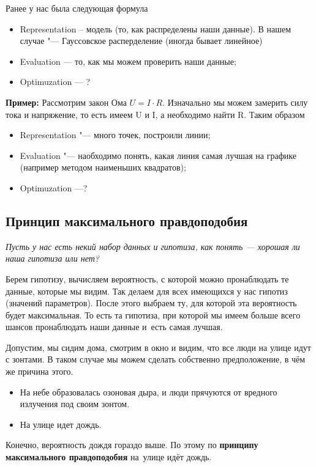 

\begin{Zam}
Ранее у нас была следующая формула\\
{ \setlength{\fboxrule}{2pt}
  \setlength{\fboxsep}{8pt}
 }
\begin{itemize}
\item Representation -- модель (то, как распределены наши данные). В нашем случае "--- Гауссовское расперделение (иногда бывает линейное)
\item Evaluation --- то, как мы можем проверить наши данные;
\item Optimuzation --- ?
\end{itemize}

{\bf Пример:} Рассмотрим закон Ома $U = I \cdot R$. Изначально мы можем замерить силу тока и напряжение, то есть имеем U и I, а необходимо найти R. Таким образом\\
\begin{itemize}
\item Representation "---  много точек, построили линии;
\item Evaluation "--- наобходимо понять, какая линия самая лучшая на графике (например методом наименьших квадратов);
\item Optimuzation ---?
\end{itemize}
\end{Zam}


\subsection{Принцип максимального правдоподобия}

{\it Пусть у нас есть некий набор данных и гипотиза, как понять --- хорошая ли наша гипотиза или нет?}

Берем гипотизу, вычисляем вероятность, с которой можно пронаблюдать те данные, которые мы видим. Так делаем для всех имеющихся у нас гипотиз (значений параметров). После этого выбраем ту, для которой эта вероятность будет максимальная. То есть та гипотиза, при которой мы имеем больше всего шансов пронаблюдать наши данные и~есть самая лучшая.

\begin{Examp}
Допустим, мы сидим дома, смотрим в окно и видим, что все люди на улице идут с зонтами. В таком случае мы можем сделать собственно предположение, в чём же причина этого.
\begin{itemize}
\item На небе образовалась озоновая дыра, и люди прячуются от вредного излучения под своим зонтом.
\item На улице идет дождь.
\end{itemize}
Конечно, вероятность дождя гораздо выше. По этому по {\bf принципу максимального правдоподобия} на~улице идёт дождь.
\end{Examp}

